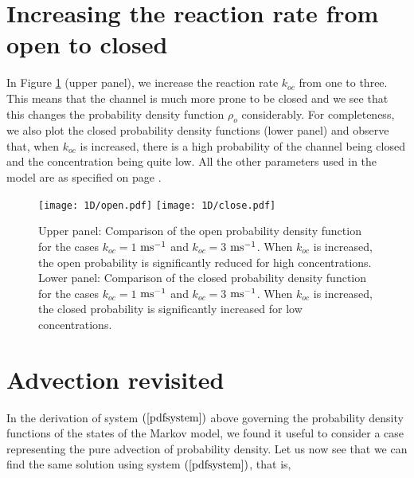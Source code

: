 



\section{Increasing the reaction rate from open to closed \label{increasingkoc}}

In Figure \ref{1D/openclose} (upper panel), we increase the reaction rate $k_{oc}$ from one to three. This means that the channel is much more prone to be closed and we see that this changes the probability density function $\rho_o$ considerably. For completeness, we also plot the closed probability density functions (lower panel) and observe that, when $k_{oc}$ is increased, there is a high probability of the channel being closed and the concentration being quite low. All the other parameters used in the model are as specified on page \pageref{tab:1Dsode}.

\begin{figure}[p]\centering
\vbox{
\texttt{[image: 1D/open.pdf]}
\texttt{[image: 1D/close.pdf]}
}
\caption{Upper panel: Comparison of the open probability density function for the cases $k_{oc}=1$ $\rm{ms^{-1}}$ and $k_{oc}=3$ $\rm{ms^{-1}}$.
 When  $k_{oc}$ is increased, the open probability is significantly reduced for high concentrations.
 Lower panel:   Comparison of the closed probability density function for the cases $k_{oc}=1$ $\rm{ms^{-1}}$ and $k_{oc}=3$ $\rm{ms^{-1}}$.
 When  $k_{oc}$ is increased, the closed probability is significantly increased for low concentrations.
    \label{1D/openclose}}
\end{figure}


\section{Advection revisited}

In the derivation of system $\left(  \ref{pdfsystem}\right)  $
above governing the probability density functions of the states of the Markov
model, we found it useful to consider a case representing the pure advection of probability density.
 Let us now see that we can find the same solution using system $\left(
\ref{pdfsystem}\right) $, that is, %

